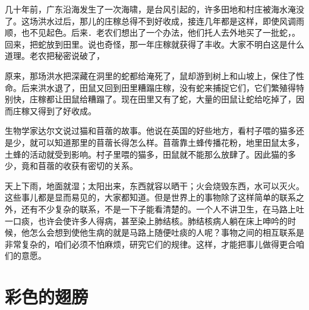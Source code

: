 \documentclass[12pt,UTF-8,openany]{ctexbook}
\begin{document}
\begin{large}
    
    几十年前，广东沿海发生了一次海啸，是台风引起的，许多田地和村庄被海水淹没了。这场洪水过后，那儿的庄稼总得不到好收成，接连几年都是这样，即使风调雨顺，也不见起色。后来．老农们想出了一个办法，他们托人去外地买了一批蛇，。回来，把蛇放到田里。说也奇怪，那一年庄稼就获得了丰收。大家不明白这是什么道理。老农把秘密说破了，
    
    原来，那场洪水把深藏在洞里的蛇都给淹死了，鼠却游到树上和山坡上，保住了性命。后来洪水退了，田鼠又回到田里糟蹋庄稼，没有蛇来捕捉它们，它们繁殖得特别快，庄稼都让田鼠给糟蹋了。现在田里又有了蛇，大量的田鼠让蛇给吃掉了，因而庄稼又得到了好收成。
    
    生物学家达尔文说过猫和苜蓿的故事。他说在英国的好些地方，看村子喂的猫多还是少，就可以知道那里的苜蓿长得怎么样。苜蓿靠土蜂传播花粉，地里田鼠太多，土蜂的活动就受到影响。村子里喂的猫多，田鼠就不能那么放肆了。因此猫的多少，竟和苜蓿的收获有密切的关系。
    
    天上下雨，地面就湿；太阳出来，东西就容以晒干；火会烧毁东西，水可以灭火。这些事儿都是显而易见的，大家都知道。但是世界上的事物除了这样简单的联系之外，还有不少复杂的联系，不是一下子能看清楚的。一个人不讲卫生，在马路上吐一口痰，也许会使许多人得病，甚至染上肺结核。肺结核病人躺在床上呻吟的时候，他怎么会想到使他生病的就是马路上随便吐痰的人呢？事物之间的相互联系是非常复杂的，咱们必须不怕麻烦，研究它们的规律。这样，才能把事儿做得更合咱们的意愿。
    
\end{large}



\chapter{彩色的翅膀}
\end{document}
